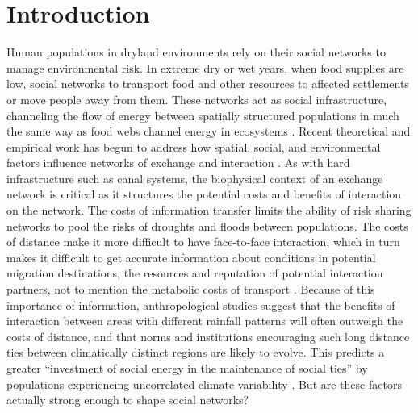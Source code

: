 \documentclass[10pt]{iopart}
\begin{document}
\section*{Introduction}
Human populations in dryland environments rely on their social networks to manage environmental risk. In extreme dry or wet years, when food supplies are low, social networks to transport food and other resources to affected settlements or move people away from them. These networks act as social infrastructure, channeling the flow of energy between spatially structured populations in much the same way as food webs channel energy in ecosystems \parencite{Crabtree2017ReconstructingStates;Crabtree2015}. Recent theoretical and empirical work has begun to address how spatial, social, and environmental factors influence networks of exchange and interaction \parencite{Nolin2010,Koster2014,Hao2015a,Schnegg2015,Freeman2014}. As with hard infrastructure such as canal systems, the biophysical context of an exchange network is critical as it structures the potential costs and benefits of interaction on the network. The costs of information transfer limits the ability of risk sharing networks to pool the risks of droughts and floods between populations. The costs of distance make it more difficult to have face-to-face interaction, which in turn makes it difficult to get accurate information about conditions in potential migration destinations, the resources and reputation of potential interaction partners, not to mention the metabolic costs of transport \parencite{ostrom,Hao2015a, Anderies2011a,Drennan1984}. Because of this importance of information, anthropological studies suggest that the benefits of interaction between areas with different rainfall patterns will often outweigh the costs of distance, and that norms and institutions encouraging such long distance ties between climatically distinct regions are likely to evolve. This predicts a greater ``investment of social energy in the maintenance of social ties'' by populations experiencing uncorrelated climate variability \parencite{Rautman1993a}. But are these factors actually strong enough to shape social networks? 
\end{document}
